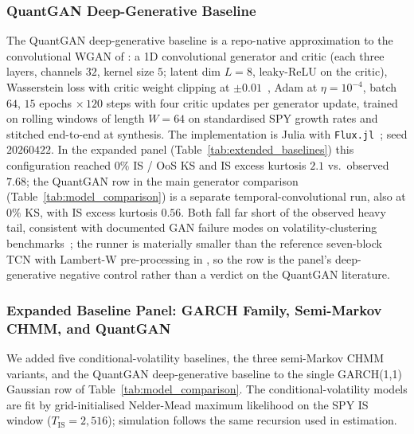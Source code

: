 \subsubsection{QuantGAN Deep-Generative Baseline}
\label{sec:quantgan_supp}

The QuantGAN deep-generative baseline is a repo-native approximation to the convolutional WGAN of \citet{wiese2020quantgan}: a 1D convolutional generator and critic (each three layers, channels $32$, kernel size $5$; latent dim $L = 8$, leaky-ReLU on the critic), Wasserstein loss with critic weight clipping at $\pm 0.01$~\citep{arjovsky2017wasserstein}, Adam at $\eta = 10^{-4}$, batch $64$, $15$ epochs $\times\,120$ steps with four critic updates per generator update, trained on rolling windows of length $W = 64$ on standardised SPY growth rates and stitched end-to-end at synthesis. The implementation is Julia with \texttt{Flux.jl}~\cite{innes2018flux}; seed $20260422$. In the expanded panel (Table~\ref{tab:extended_baselines}) this configuration reached $0\%$ IS / OoS KS and IS excess kurtosis $2.1$ vs.\ observed $7.68$; the QuantGAN row in the main generator comparison (Table~\ref{tab:model_comparison}) is a separate temporal-convolutional run, also at $0\%$ KS, with IS excess kurtosis $0.56$. Both fall far short of the observed heavy tail, consistent with documented GAN failure modes on volatility-clustering benchmarks~\citep{takahashi2019modeling, kwon2024can}; the runner is materially smaller than the reference seven-block TCN with Lambert-W pre-processing in \citet{wiese2020quantgan}, so the row is the panel's deep-generative negative control rather than a verdict on the QuantGAN literature.

\subsubsection{Expanded Baseline Panel: GARCH Family, Semi-Markov CHMM, and QuantGAN}
\label{sec:extended_baselines}

We added five conditional-volatility baselines, the three semi-Markov CHMM variants, and the QuantGAN deep-generative baseline to the single GARCH(1,1) Gaussian row of Table~\ref{tab:model_comparison}. The conditional-volatility models are fit by grid-initialised Nelder-Mead maximum likelihood on the SPY IS window ($T_{\text{IS}} = 2{,}516$); simulation follows the same recursion used in estimation.

